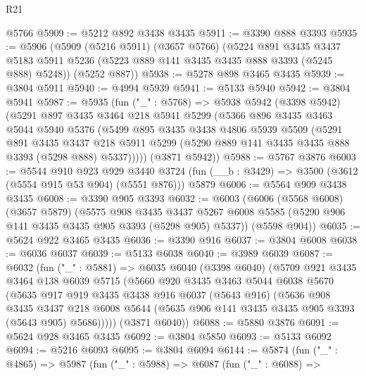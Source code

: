 \begin{lexlean}{R21}
\begin{coremodule}
    @5766
@5909 := @5212 @892 @3438 @3435
@5911 := @3390 @888 @3393
@5935 := @5906
    (@5909
      (@5216 @5911)
      (@3657 @5766)
      (@5224
        @891
        @3435
        @3437
        @5183
        @5911
        @5236
        (@5223 @889 @141 @3435 @3435 @888 @3393 (@5245 @888) @5248))
      (@5252 @887))
@5938 := @5278 @898 @3465 @3435
@5939 := @3804 @5911
@5940 := @4994 @5939
@5941 := @5133 @5940
@5942 := @3804 @5941
@5987 := @5935
    (fun ("_" : @5768) =>
    @5938
      @5942
      (@3398 @5942)
      (@5291
        @897
        @3435
        @3464
        @218
        @5941
        @5299
        (@5366
          @896
          @3435
          @3463
          @5044
          @5940
          @5376
          (@5499
            @895
            @3435
            @3438
            @4806
            @5939
            @5509
            (@5291
              @891
              @3435
              @3437
              @218
              @5911
              @5299
              (@5290 @889 @141 @3435 @3435 @888 @3393 (@5298 @888) @5337)))))
      (@3871 @5942))
@5988 := @5767 @3876
@6003 := @5544
    @910
    @923
    @929
    @3440
    @3724
    (fun (__b : @3429) => @3500 (@3612 (@5554 @915 @53 @904) (@5551 @876)))
    @5879
@6006 := @5564 @909 @3438 @3435
@6008 := @3390 @905 @3393
@6032 := @6003
    (@6006
      (@5568 @6008)
      (@3657 @5879)
      (@5575
        @908
        @3435
        @3437
        @5267
        @6008
        @5585
        (@5290 @906 @141 @3435 @3435 @905 @3393 (@5298 @905) @5337))
      (@5598 @904))
@6035 := @5624 @922 @3465 @3435
@6036 := @3390 @916
@6037 := @3804 @6008
@6038 := @6036 @6037
@6039 := @5133 @6038
@6040 := @3989 @6039
@6087 := @6032
    (fun ("_" : @5881) =>
    @6035
      @6040
      (@3398 @6040)
      (@5709
        @921
        @3435
        @3464
        @138
        @6039
        @5715
        (@5660
          @920
          @3435
          @3463
          @5044
          @6038
          @5670
          (@5635
            @917
            @919
            @3435
            @3438
            @916
            @6037
            (@5643 @916)
            (@5636
              @908
              @3435
              @3437
              @218
              @6008
              @5644
              (@5635 @906 @141 @3435 @3435 @905 @3393 (@5643 @905) @5686)))))
      (@3871 @6040))
@6088 := @5880 @3876
@6091 := @5624 @928 @3465 @3435
@6092 := @3804 @5850
@6093 := @5133 @6092
@6094 := @5216 @6093
@6095 := @3804 @6094
@6144 := @5874
    (fun ("_" : @4865) =>
    @5987
      (fun ("_" : @5988) =>
      @6087
        (fun ("_" : @6088) =>

\end{coremodule}
\end{lexlean}
